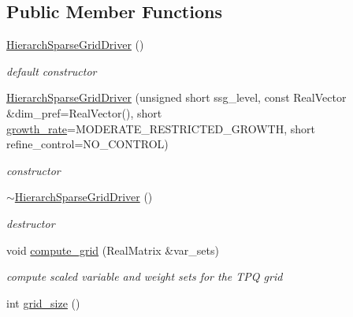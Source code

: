 \subsection*{Public Member Functions}
\begin{DoxyCompactItemize}
\item 
\hyperlink{classPecos_1_1HierarchSparseGridDriver_ad6a2a4e748e03e3ba2bdd345500ef4f8}{Hierarch\+Sparse\+Grid\+Driver} ()\label{classPecos_1_1HierarchSparseGridDriver_ad6a2a4e748e03e3ba2bdd345500ef4f8}

\begin{DoxyCompactList}\small\item\em default constructor \end{DoxyCompactList}\item 
\hyperlink{classPecos_1_1HierarchSparseGridDriver_acac0f069a3580f15255657c0947bcce4}{Hierarch\+Sparse\+Grid\+Driver} (unsigned short ssg\+\_\+level, const Real\+Vector \&dim\+\_\+pref=Real\+Vector(), short \hyperlink{classPecos_1_1SparseGridDriver_a6f9061513ba25c62ee7a49b0d5da42cc}{growth\+\_\+rate}=M\+O\+D\+E\+R\+A\+T\+E\+\_\+\+R\+E\+S\+T\+R\+I\+C\+T\+E\+D\+\_\+\+G\+R\+O\+W\+TH, short refine\+\_\+control=N\+O\+\_\+\+C\+O\+N\+T\+R\+OL)\label{classPecos_1_1HierarchSparseGridDriver_acac0f069a3580f15255657c0947bcce4}

\begin{DoxyCompactList}\small\item\em constructor \end{DoxyCompactList}\item 
\hyperlink{classPecos_1_1HierarchSparseGridDriver_abc8d6a084fc56fef23762fee84792e12}{$\sim$\+Hierarch\+Sparse\+Grid\+Driver} ()\label{classPecos_1_1HierarchSparseGridDriver_abc8d6a084fc56fef23762fee84792e12}

\begin{DoxyCompactList}\small\item\em destructor \end{DoxyCompactList}\item 
void \hyperlink{classPecos_1_1HierarchSparseGridDriver_a30b0bccf09758808aeb7e9ca33fae2ff}{compute\+\_\+grid} (Real\+Matrix \&var\+\_\+sets)\label{classPecos_1_1HierarchSparseGridDriver_a30b0bccf09758808aeb7e9ca33fae2ff}

\begin{DoxyCompactList}\small\item\em compute scaled variable and weight sets for the T\+PQ grid \end{DoxyCompactList}\item 
int \hyperlink{classPecos_1_1HierarchSparseGridDriver_a4b04c73f01f5eb9e6171305141eb1f73}{grid\+\_\+size} ()\label{classPecos_1_1HierarchSparseGridDriver_a4b04c73f01f5eb9e6171305141eb1f73}


\end{DoxyCompactItemize}

